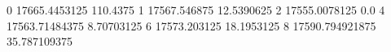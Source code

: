 0 17665.4453125 110.4375
1 17567.546875 12.5390625
2 17555.0078125 0.0
4 17563.71484375 8.70703125
6 17573.203125 18.1953125
8 17590.794921875 35.787109375
